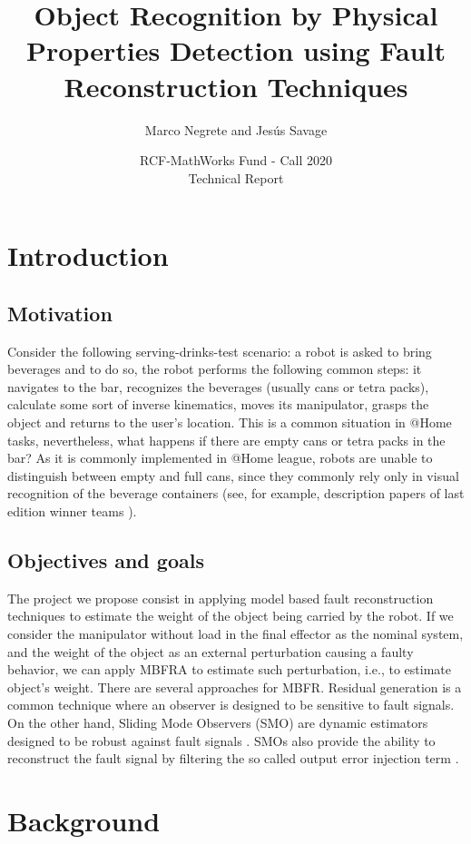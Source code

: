 \documentclass[a4paper, 10pt]{article}
\title{Object Recognition by Physical Properties Detection using Fault Reconstruction Techniques}
\author{Marco Negrete and Jesús Savage}
\date{RCF-MathWorks Fund - Call 2020\\Technical Report}
\begin{document}
\maketitle

\section{Introduction}
\subsection{Motivation}
Consider the following serving-drinks-test scenario: a robot is asked to bring beverages and to do so, the robot performs the following common steps: it navigates to the bar, recognizes the beverages (usually cans or tetra packs), calculate some sort of inverse kinematics, moves its manipulator, grasps the object and returns to the user's location. This is a common situation in @Home tasks, nevertheless, what happens if there are empty cans or tetra packs in the bar? As it is commonly implemented in @Home league, robots are unable to distinguish between empty and full cans, since they commonly rely only in visual recognition of the beverage containers (see, for example, description papers of last edition winner teams \cite{tdp2019Eindhoven, tdp2019Homer, tdp2019UTS}).
\subsection{Objectives and goals}
The project we propose consist in applying model based fault reconstruction techniques \cite{ding2013model} to estimate the weight of the object being carried by the robot. If we consider the manipulator without load in the final effector as the nominal system, and the weight of the object as an external perturbation causing a faulty behavior, we can apply MBFRA to estimate such perturbation, i.e., to estimate object's weight. There are several approaches for MBFR. Residual generation is a common technique where an observer is designed to be sensitive to fault signals. On the other hand, Sliding Mode Observers (SMO) are dynamic estimators designed to be robust against fault signals \cite{shtessel2014sliding}. SMOs also provide the ability to reconstruct the fault signal by filtering the so called output error injection term \cite{alwi2011fault}.

\section{Background}
\end{document}
